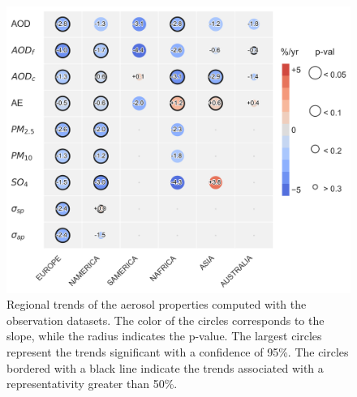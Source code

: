 \documentclass[acp, manuscript]{copernicus}
\providecommand{\DIFadd}[1]{{\protect\color{blue}\uwave{#1}}} %
\providecommand{\DIFaddFL}[1]{\DIFadd{#1}} %
\providecommand{\DIFaddbeginFL}{} %
\providecommand{\DIFaddendFL}{} %
\begin{document}
\clearpage
\begin{figure}[t]
 \includegraphics[width=12cm]{../scripts/figs/heatmaps/OBS.png}
 \caption{Regional trends of the aerosol properties computed with the observation datasets. The color of the circles corresponds to the slope, while the radius indicates the p-value. The largest circles represent the trends significant with a confidence \DIFaddbeginFL \DIFaddFL{level }\DIFaddendFL of 95\%. The circles bordered with a black line indicate the trends associated with a representativity greater than 50\%.}
 \label{fig:obs_trends}
\end{figure}
\end{document}
